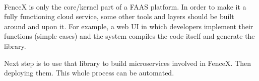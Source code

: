 \documentclass[a4]{report}
\begin{document}
    \paragraph{}
    FenceX is only the core/kernel part of a FAAS platform.
    In order to make it a fully functioning cloud service, some other tools and layers should be built around and
    upon it.
    For example, a web UI in which developers implement their functions (simple cases) and the system compiles
    the code itself and generate the library.

    Next step is to use that library to build microservices involved in FenceX.
    Then deploying them.
    This whole process can be automated.

    \nocite{*}
    
    
\end{document}
